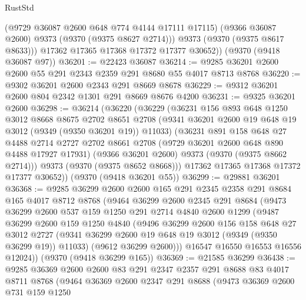 \begin{lexlean}{RustStd}
\begin{coremodule}
{\begin{coremodule}
{{{{{{{{{{{{{{{{{{{{{{{{{{{{{{{{{{{{{{{            (@9729 @36087 @2600 @648 @774 @4144 @17111 @17115)
            (@9366 @36087 @2600)
            @9373
            (@9370 (@9375 @8627 @2714)))
          @9373
          (@9370 (@9375 @8617 @8633)))
        @17362
        @17365
        @17368
        @17372
        @17377
        @30652))
    (@9370 (@9418 @36087 @97))
@36201 := @22423 @36087
@36214 := @9285 @36201 @2600 @2600 @55 @291 @2343 @2359 @291 @8680 @55 @4017 @8713 @8768
@36220 := @9302 @36201 @2600 @2343 @291 @8669 @8678
@36229 := @9312 @36201 @2600 @804 @2342 @1301 @291 @8669 @8676 @4200
@36231 := @9325 @36201 @2600
@36298 := @36214
    (@36220
      (@36229
        (@36231
          @156
          @893
          @648
          @1250
          @3012
          @8668
          @8675
          @2702
          @8651
          @2708
          (@9341 @36201 @2600 @19 @648 @19 @3012 (@9349 (@9350 @36201 @19)) @11033)
          (@36231
            @891
            @158
            @648
            @27
            @4488
            @2714
            @2727
            @2702
            @8661
            @2708
            (@9729 @36201 @2600 @648 @890 @4488 @17927 @17931)
            (@9366 @36201 @2600)
            @9373
            (@9370 (@9375 @8662 @2714)))
          @9373
          (@9370 (@9375 @8652 @8668)))
        @17362
        @17365
        @17368
        @17372
        @17377
        @30652))
    (@9370 (@9418 @36201 @55))
@36299 := @29881 @36201
@36368 := @9285
    @36299
    @2600
    @2600
    @165
    @291
    @2345
    @2358
    @291
    @8684
    @165
    @4017
    @8712
    @8768
    (@9464
      @36299
      @2600
      @2345
      @291
      @8684
      (@9473
        @36299
        @2600
        @537
        @159
        @1250
        @291
        @2714
        @4840
        @2600
        @1299
        (@9487
          @36299
          @2600
          @159
          @1250
          @4840
          (@9496
            @36299
            @2600
            @156
            @158
            @648
            @27
            @3012
            @2727
            (@9341 @36299 @2600 @19 @648 @19 @3012 (@9349 (@9350 @36299 @19)) @11033)
            (@9612 @36299 @2600)))
        @16547
        @16550
        @16553
        @16556
        @12024))
    (@9370 (@9418 @36299 @165))
@36369 := @21585 @36299
@36438 := @9285
    @36369
    @2600
    @2600
    @83
    @291
    @2347
    @2357
    @291
    @8688
    @83
    @4017
    @8711
    @8768
    (@9464
      @36369
      @2600
      @2347
      @291
      @8688
      (@9473
        @36369
        @2600
        @731
        @159
        @1250
}}}}}}}}}}}}}}}}}}}}}}}}}}}}}}}}}}}}}}}
\end{coremodule}}
\end{coremodule}
\end{lexlean}
